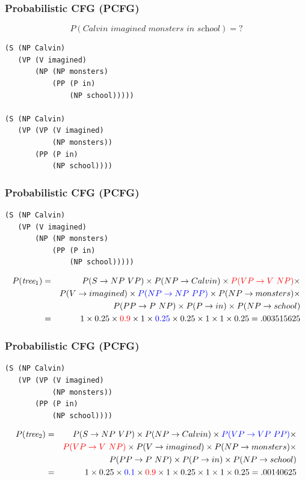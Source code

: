 \begin{frame}[fragile]
\frametitle{Probabilistic CFG (PCFG)}
\[ P(\textit{Calvin imagined monsters in school}) = ? \]
\begin{verbatim}
(S (NP Calvin)
   (VP (V imagined)
       (NP (NP monsters)
           (PP (P in)
               (NP school)))))

(S (NP Calvin)
   (VP (VP (V imagined)
           (NP monsters))
       (PP (P in)
           (NP school))))
\end{verbatim}

\end{frame}

\begin{frame}[fragile]
\frametitle{Probabilistic CFG (PCFG)}
\begin{verbatim}
(S (NP Calvin)
   (VP (V imagined)
       (NP (NP monsters)
           (PP (P in)
               (NP school)))))
\end{verbatim}
{\small
\begin{eqnarray*}
P(\textit{tree$_1$})& = & P(S \rightarrow NP\ VP) \times
      P(NP \rightarrow Calvin) \times
      {\color{red} P(VP \rightarrow V\ NP)} \times \nonumber \\
&& P(V \rightarrow imagined) \times 
   {\color{blue} P(NP \rightarrow NP\ PP)} \times
   P(NP \rightarrow monsters) \times \nonumber \\
&& P(PP \rightarrow P\ NP) \times  
   P(P \rightarrow in) \times  
   P(NP \rightarrow school) \nonumber \\
& = & 1 \times 0.25 \times {\color{red} 0.9} \times 1 \times {\color{blue} 0.25} \times 0.25 \times 1 \times 1 \times 0.25 = .003515625 \nonumber 
\end{eqnarray*}
}
\end{frame}

\begin{frame}[fragile]
\frametitle{Probabilistic CFG (PCFG)}
\begin{verbatim}
(S (NP Calvin)
   (VP (VP (V imagined)
           (NP monsters))
       (PP (P in)
           (NP school))))
\end{verbatim}
{\small
\begin{eqnarray*}
P(\textit{tree$_2$})& = & P(S \rightarrow NP\ VP) \times
      P(NP \rightarrow Calvin) \times
      {\color{blue} P(VP \rightarrow VP\ PP)} \times \nonumber \\
&& {\color{red} P(VP \rightarrow V\ NP)} \times
   P(V \rightarrow imagined) \times 
   P(NP \rightarrow monsters) \times \nonumber \\
&& P(PP \rightarrow P\ NP) \times  
   P(P \rightarrow in) \times  
   P(NP \rightarrow school) \nonumber \\
& = & 1 \times 0.25 \times {\color{blue} 0.1} \times {\color{red} 0.9} \times 1 \times 0.25 \times 1 \times 1 \times 0.25 = .00140625 \nonumber 
\end{eqnarray*}
}
\end{frame}

